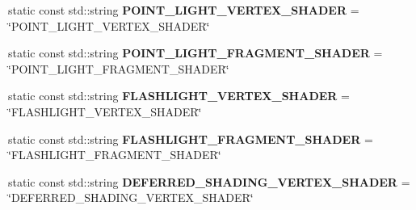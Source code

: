 \begin{DoxyCompactItemize}
\mbox{\label{struct_geometry_engine_1_1_geometry_world_item_1_1_geometry_light_1_1_light_shader_constants_acae35ac682b55a9de725f127dd2f2204}} 
static const std\+::string {\bfseries P\+O\+I\+N\+T\+\_\+\+L\+I\+G\+H\+T\+\_\+\+V\+E\+R\+T\+E\+X\+\_\+\+S\+H\+A\+D\+ER} = \char`\"{}P\+O\+I\+N\+T\+\_\+\+L\+I\+G\+H\+T\+\_\+\+V\+E\+R\+T\+E\+X\+\_\+\+S\+H\+A\+D\+ER\char`\"{}
\item 
\mbox{\label{struct_geometry_engine_1_1_geometry_world_item_1_1_geometry_light_1_1_light_shader_constants_acc7a112427c5b3e36f191a30bda6b6f2}} 
static const std\+::string {\bfseries P\+O\+I\+N\+T\+\_\+\+L\+I\+G\+H\+T\+\_\+\+F\+R\+A\+G\+M\+E\+N\+T\+\_\+\+S\+H\+A\+D\+ER} = \char`\"{}P\+O\+I\+N\+T\+\_\+\+L\+I\+G\+H\+T\+\_\+\+F\+R\+A\+G\+M\+E\+N\+T\+\_\+\+S\+H\+A\+D\+ER\char`\"{}
\item 
\mbox{\label{struct_geometry_engine_1_1_geometry_world_item_1_1_geometry_light_1_1_light_shader_constants_a078ab908f8934ca0f488b3c85d6f791e}} 
static const std\+::string {\bfseries F\+L\+A\+S\+H\+L\+I\+G\+H\+T\+\_\+\+V\+E\+R\+T\+E\+X\+\_\+\+S\+H\+A\+D\+ER} = \char`\"{}F\+L\+A\+S\+H\+L\+I\+G\+H\+T\+\_\+\+V\+E\+R\+T\+E\+X\+\_\+\+S\+H\+A\+D\+ER\char`\"{}
\item 
\mbox{\label{struct_geometry_engine_1_1_geometry_world_item_1_1_geometry_light_1_1_light_shader_constants_a82abc5bddd96c382e4b6af874221c58b}} 
static const std\+::string {\bfseries F\+L\+A\+S\+H\+L\+I\+G\+H\+T\+\_\+\+F\+R\+A\+G\+M\+E\+N\+T\+\_\+\+S\+H\+A\+D\+ER} = \char`\"{}F\+L\+A\+S\+H\+L\+I\+G\+H\+T\+\_\+\+F\+R\+A\+G\+M\+E\+N\+T\+\_\+\+S\+H\+A\+D\+ER\char`\"{}
\item 
\mbox{\label{struct_geometry_engine_1_1_geometry_world_item_1_1_geometry_light_1_1_light_shader_constants_abeef92b7f01c346321a329eb0a042a3a}} 
static const std\+::string {\bfseries D\+E\+F\+E\+R\+R\+E\+D\+\_\+\+S\+H\+A\+D\+I\+N\+G\+\_\+\+V\+E\+R\+T\+E\+X\+\_\+\+S\+H\+A\+D\+ER} = \char`\"{}D\+E\+F\+E\+R\+R\+E\+D\+\_\+\+S\+H\+A\+D\+I\+N\+G\+\_\+\+V\+E\+R\+T\+E\+X\+\_\+\+S\+H\+A\+D\+ER\char`\"{}

\end{DoxyCompactItemize}
